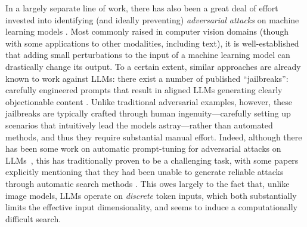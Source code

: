 In a largely separate line of work, there has also been a great deal of effort invested into identifying (and ideally preventing) \emph{adversarial attacks} on machine learning models \citep{szegedy2014intriguing,biggio2013evasion,papernot2016limitations,carlini2017towards}.  Most commonly raised in computer vision domains (though with some applications to other modalities, including text), it is well-established that adding small perturbations to the input of a machine learning model can drastically change its output.  To a certain extent, similar approaches are already known to work against LLMs: there exist a number of published ``jailbreaks'': carefully engineered prompts that result in aligned LLMs generating clearly objectionable content \citep{wei2023jailbroken}.  Unlike traditional adversarial examples, however, these jailbreaks are typically crafted through human ingenuity---carefully setting up scenarios that intuitively lead the models astray---rather than automated methods, and thus they require substantial manual effort.  Indeed, although there has been some work on automatic prompt-tuning for adversarial attacks on LLMs~\citep{shin2020autoprompt,wen2023hard,jones2023automatically}, this has traditionally proven to be a challenging task, with some papers explicitly mentioning that they had been unable to generate reliable attacks through automatic search methods \citep{carlini2023aligned}.  This owes largely to the fact that, unlike image models, LLMs operate on \emph{discrete} token inputs, which both substantially limits the effective input dimensionality, and seems to induce a computationally difficult search.


